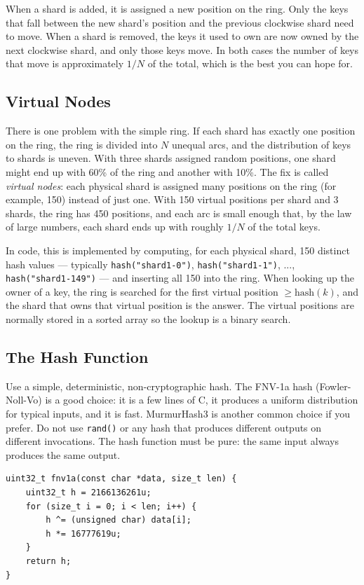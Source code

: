 \documentclass[11pt,a4paper]{article}
\begin{document}
When a shard is added, it is assigned a new position on the ring. Only the keys that fall between the new shard's position and the previous clockwise shard need to move. When a shard is removed, the keys it used to own are now owned by the next clockwise shard, and only those keys move. In both cases the number of keys that move is approximately $1/N$ of the total, which is the best you can hope for.

\subsection{Virtual Nodes}
There is one problem with the simple ring. If each shard has exactly one position on the ring, the ring is divided into $N$ unequal arcs, and the distribution of keys to shards is uneven. With three shards assigned random positions, one shard might end up with 60\% of the ring and another with 10\%. The fix is called \textit{virtual nodes}: each physical shard is assigned many positions on the ring (for example, 150) instead of just one. With 150 virtual positions per shard and 3 shards, the ring has 450 positions, and each arc is small enough that, by the law of large numbers, each shard ends up with roughly $1/N$ of the total keys.

In code, this is implemented by computing, for each physical shard, 150 distinct hash values --- typically \texttt{hash("shard1-0")}, \texttt{hash("shard1-1")}, ..., \texttt{hash("shard1-149")} --- and inserting all 150 into the ring. When looking up the owner of a key, the ring is searched for the first virtual position $\geq \text{hash}(k)$, and the shard that owns that virtual position is the answer. The virtual positions are normally stored in a sorted array so the lookup is a binary search.

\subsection{The Hash Function}
Use a simple, deterministic, non-cryptographic hash. The FNV-1a hash (Fowler-Noll-Vo) is a good choice: it is a few lines of C, it produces a uniform distribution for typical inputs, and it is fast. MurmurHash3 is another common choice if you prefer. Do not use \texttt{rand()} or any hash that produces different outputs on different invocations. The hash function must be pure: the same input always produces the same output.

\begin{codebox}
\begin{lstlisting}
uint32_t fnv1a(const char *data, size_t len) {
    uint32_t h = 2166136261u;
    for (size_t i = 0; i < len; i++) {
        h ^= (unsigned char) data[i];
        h *= 16777619u;
    }
    return h;
}
\end{lstlisting}
\end{codebox}
\end{document}

